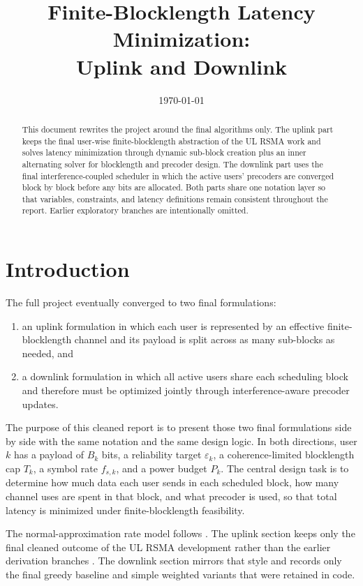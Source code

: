 \documentclass[11pt]{article}
\title{Finite-Blocklength Latency Minimization:\\Uplink and Downlink }
\author{}
\date{\today}
\begin{document}
\maketitle

\begin{abstract}
This document rewrites the project around the final algorithms only. The uplink part keeps the final user-wise finite-blocklength abstraction of the UL RSMA work and solves latency minimization through dynamic sub-block creation plus an inner alternating solver for blocklength and precoder design. The downlink part uses the final interference-coupled scheduler in which the active users' precoders are converged block by block before any bits are allocated. Both parts share one notation layer so that variables, constraints, and latency definitions remain consistent throughout the report. Earlier exploratory branches are intentionally omitted.
\end{abstract}

\section{Introduction}
The full project eventually converged to two final formulations:
\begin{enumerate}
    \item an uplink formulation in which each user is represented by an effective finite-blocklength channel and its payload is split across as many sub-blocks as needed, and
    \item a downlink formulation in which all active users share each scheduling block and therefore must be optimized jointly through interference-aware precoder updates.
\end{enumerate}

The purpose of this cleaned report is to present those two final formulations side by side with the same notation and the same design logic. In both directions, user $k$ has a payload of $B_k$ bits, a reliability target $\varepsilon_k$, a coherence-limited blocklength cap $T_k$, a symbol rate $f_{s,k}$, and a power budget $P_k$. The central design task is to determine how much data each user sends in each scheduled block, how many channel uses are spent in that block, and what precoder is used, so that total latency is minimized under finite-blocklength feasibility.

The normal-approximation rate model follows \cite{polyanskiy2010}. The uplink section keeps only the final cleaned outcome of the UL RSMA development rather than the earlier derivation branches \cite{zhang2023}. The downlink section mirrors that style and records only the final greedy baseline and simple weighted variants that were retained in code.
\end{document}
